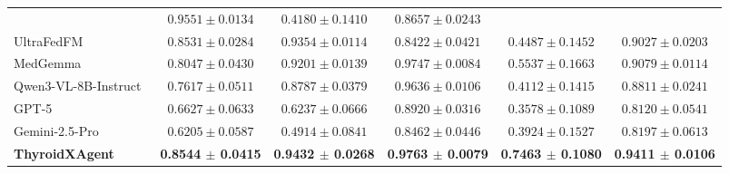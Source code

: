 \begin{table}[p]
\begin{threeparttable}
\begin{tabular}{lccccc}
& $0.9551 \pm 0.0134$
& $0.4180 \pm 0.1410$
& $0.8657 \pm 0.0243$ \\
UltraFedFM~\cite{jiang2025pretraining}
& $0.8531 \pm 0.0284$
& $0.9354 \pm 0.0114$
& $0.8422 \pm 0.0421$
& $0.4487 \pm 0.1452$
& $0.9027 \pm 0.0203$ \\
MedGemma~\cite{sellergren2025medgemma}
& $0.8047 \pm 0.0430$
& $0.9201 \pm 0.0139$
& $0.9747 \pm 0.0084$
& $0.5537 \pm 0.1663$
& $0.9079 \pm 0.0114$ \\
Qwen3-VL-8B-Instruct~\cite{bai2025qwen3}
& $0.7617 \pm 0.0511$
& $0.8787 \pm 0.0379$
& $0.9636 \pm 0.0106$
& $0.4112 \pm 0.1415$
& $0.8811 \pm 0.0241$ \\
GPT-5~\cite{openai2025gpt5systemcard}
& $0.6627 \pm 0.0633$
& $0.6237 \pm 0.0666$
& $0.8920 \pm 0.0316$
& $0.3578 \pm 0.1089$
& $0.8120 \pm 0.0541$ \\
Gemini-2.5-Pro~\cite{comanici_gemini_2025}
& $0.6205 \pm 0.0587$
& $0.4914 \pm 0.0841$
& $0.8462 \pm 0.0446$
& $0.3924 \pm 0.1527$
& $0.8197 \pm 0.0613$ \\
\rowcolor{lightgray}
\textbf{ThyroidXAgent}
& \textbf{0.8544 $\pm$ 0.0415}
& \textbf{0.9432 $\pm$ 0.0268}
& \textbf{0.9763 $\pm$ 0.0079}
& \textbf{0.7463 $\pm$ 0.1080}
& \textbf{0.9411 $\pm$ 0.0106} \\
\bottomrule
\end{tabular}
\end{threeparttable}
\end{table}
